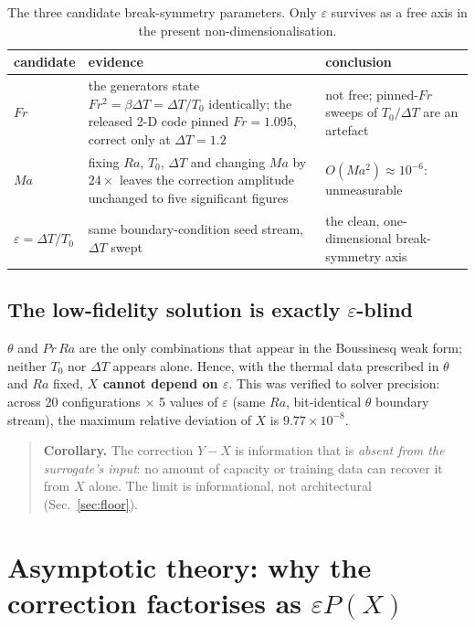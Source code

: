 \documentclass[11pt,a4paper]{article}
\begin{document}
\begin{table}[htbp]
\centering
\small
\caption{The three candidate break-symmetry parameters. Only $\varepsilon$ survives as a free
axis in the present non-dimensionalisation.}
\label{tab:axis}
\begin{tabular}{@{}p{2.4cm}p{9.0cm}p{4.2cm}@{}}
\toprule
candidate & evidence & conclusion\\
\midrule
$Fr$ & the generators state $Fr^2=\beta\Delta T=\Delta T/T_0$ identically; the released 2-D code
pinned $Fr=1.095$, correct only at $\Delta T=1.2$ & not free; pinned-$Fr$ sweeps of $T_0/\Delta T$
are an artefact\\
$Ma$ & fixing $Ra$, $T_0$, $\Delta T$ and changing $Ma$ by $24\times$ leaves the correction
amplitude unchanged to five significant figures & $O(Ma^2)\approx10^{-6}$: unmeasurable\\
$\varepsilon=\Delta T/T_0$ & same boundary-condition seed stream, $\Delta T$ swept & the clean,
one-dimensional break-symmetry axis\\
\bottomrule
\end{tabular}
\end{table}

\subsection{The low-fidelity solution is exactly $\varepsilon$-blind}
\label{sec:blind}

$\theta$ and $Pr\,Ra$ are the only combinations that appear in the Boussinesq weak form; neither
$T_0$ nor $\Delta T$ appears alone. Hence, with the thermal data prescribed in $\theta$ and $Ra$
fixed, \textbf{$X$ cannot depend on $\varepsilon$}. This was verified to solver precision: across
20 configurations $\times$ 5 values of $\varepsilon$ (same $Ra$, bit-identical $\theta$ boundary
stream), the maximum relative deviation of $X$ is $9.77\times10^{-8}$.

\begin{quote}
\noindent\textbf{Corollary.} The correction $Y-X$ is information that is \emph{absent from the
surrogate's input}: no amount of capacity or training data can recover it from $X$ alone. The limit
is informational, not architectural (Sec.~\ref{sec:floor}).
\end{quote}

\section{Asymptotic theory: why the correction factorises as $\varepsilon P(X)$}
\label{sec:theory}
\end{document}
